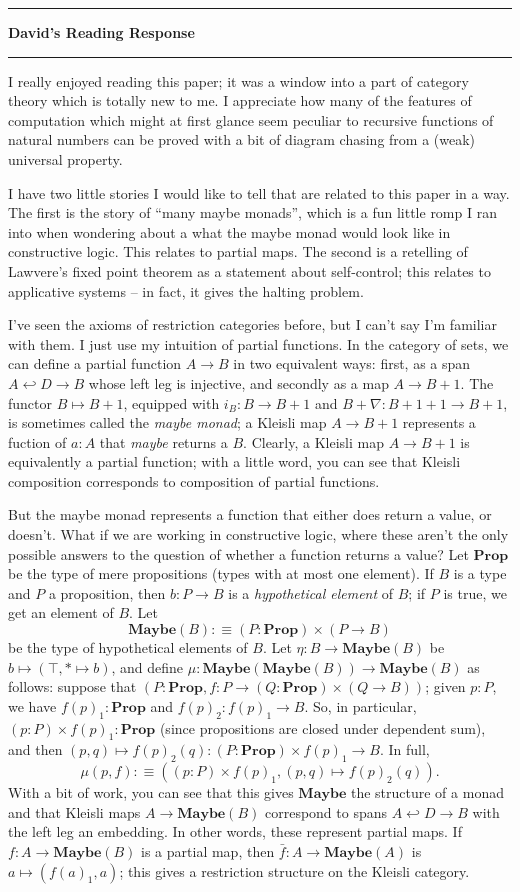 \documentclass{amsart}
\newcommand{\iam}[1]{
  \vspace{0.25em}
  \hrule
  \vspace{0.25em}
  \textbf{{#1}'s Reading Response}
  \vspace{0.25em}
  \hrule
  \vspace{1em}
}
\begin{document}
\iam{David}
I really enjoyed reading this paper; it was a window into a part of category theory which is totally new to me. I appreciate how many of the features of computation which might at first glance seem peculiar to recursive functions of natural numbers can be proved with a bit of diagram chasing from a (weak) universal property.

I have two little stories I would like to tell that are related to this paper in a way. The first is the story of ``many maybe monads'', which is a fun little romp I ran into when wondering about a what the maybe monad would look like in constructive logic. This relates to partial maps. The second is a retelling of Lawvere's fixed point theorem as a statement about self-control; this relates to applicative systems -- in fact, it gives the halting problem.

I've seen the axioms of restriction categories before, but I can't say I'm familiar with them. I just use my intuition of partial functions. In the category of sets, we can define a partial function $A \to B$ in two equivalent ways: first, as a span $A \hookleftarrow D \to B$ whose left leg is injective, and secondly as a map $A \to B + 1$. The functor $B \mapsto B + 1$, equipped with $i_B : B \to B + 1$ and $B + \nabla : B + 1 + 1 \to B + 1$, is sometimes called the \emph{maybe monad}; a Kleisli map $A \to B + 1$ represents a fuction of $a : A$ that \emph{maybe} returns a $B$. Clearly, a Kleisli map $A \to B + 1$ is equivalently a partial function; with a little word, you can see that Kleisli composition corresponds to composition of partial functions.

But the maybe monad represents a function that either does return a value, or doesn't. What if we are working in constructive logic, where these aren't the only possible answers to the question of whether a function returns a value? Let $\textbf{Prop}$ be the type of mere propositions (types with at most one element). If $B$ is a type and $P$ a proposition, then $b : P \to B$ is a \emph{hypothetical element} of $B$; if $P$ is true, we get an element of $B$. Let
$$\textbf{Maybe}(B) :\equiv (P : \textbf{Prop}) \times (P \to B)$$
be the type of hypothetical elements of $B$. Let $\eta : B \to \textbf{Maybe}(B)$ be $b \mapsto (\top, \ast \mapsto b)$, and define $\mu : \textbf{Maybe}(\textbf{Maybe}(B)) \to \textbf{Maybe}(B)$ as follows: suppose that $(P : \textbf{Prop}, f : P \to (Q : \textbf{Prop}) \times (Q \to B))$; given $p : P$, we have $f(p)_1 : \textbf{Prop}$ and $f(p)_2 : f(p)_1 \to B$. So, in particular, $(p : P) \times f(p)_1 : \textbf{Prop}$ (since propositions are closed under dependent sum), and then $(p, q) \mapsto f(p)_2(q) : (P : \textbf{Prop}) \times f(p)_1 \to B$. In full,
$$\mu(p, f) :\equiv ((p : P) \times f(p)_1, (p, q) \mapsto f(p)_2(q)).$$
With a bit of work, you can see that this gives $\textbf{Maybe}$ the structure of a monad and that Kleisli maps $A \to \textbf{Maybe}(B)$ correspond to spans $A \hookleftarrow D \to B$ with the left leg an embedding. In other words, these represent partial maps. If $f : A \to \textbf{Maybe}(B)$ is a partial map, then $\bar{f} : A \to \textbf{Maybe}(A)$ is $a \mapsto (f(a)_1, a)$; this gives a restriction structure on the Kleisli category.
\end{document}
